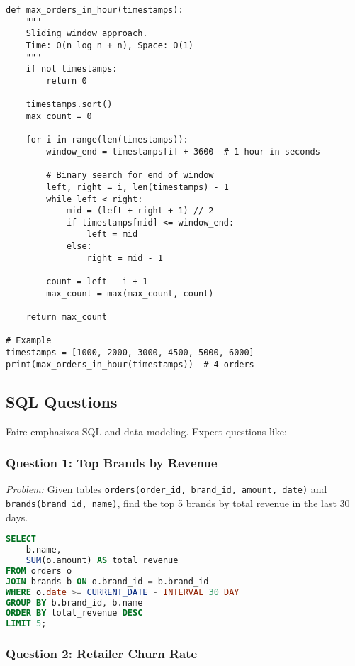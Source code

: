 \documentclass[11pt,letterpaper]{article}
\begin{document}
\begin{lstlisting}
def max_orders_in_hour(timestamps):
    """
    Sliding window approach.
    Time: O(n log n + n), Space: O(1)
    """
    if not timestamps:
        return 0

    timestamps.sort()
    max_count = 0

    for i in range(len(timestamps)):
        window_end = timestamps[i] + 3600  # 1 hour in seconds

        # Binary search for end of window
        left, right = i, len(timestamps) - 1
        while left < right:
            mid = (left + right + 1) // 2
            if timestamps[mid] <= window_end:
                left = mid
            else:
                right = mid - 1

        count = left - i + 1
        max_count = max(max_count, count)

    return max_count

# Example
timestamps = [1000, 2000, 3000, 4500, 5000, 6000]
print(max_orders_in_hour(timestamps))  # 4 orders
\end{lstlisting}

\subsection{SQL Questions}

Faire emphasizes SQL and data modeling. Expect questions like:

\subsubsection{Question 1: Top Brands by Revenue}

\textit{Problem:} Given tables \texttt{orders(order\_id, brand\_id, amount, date)} and \texttt{brands(brand\_id, name)}, find the top 5 brands by total revenue in the last 30 days.

\begin{lstlisting}[language=SQL]
SELECT
    b.name,
    SUM(o.amount) AS total_revenue
FROM orders o
JOIN brands b ON o.brand_id = b.brand_id
WHERE o.date >= CURRENT_DATE - INTERVAL 30 DAY
GROUP BY b.brand_id, b.name
ORDER BY total_revenue DESC
LIMIT 5;
\end{lstlisting}

\subsubsection{Question 2: Retailer Churn Rate}
\end{document}
